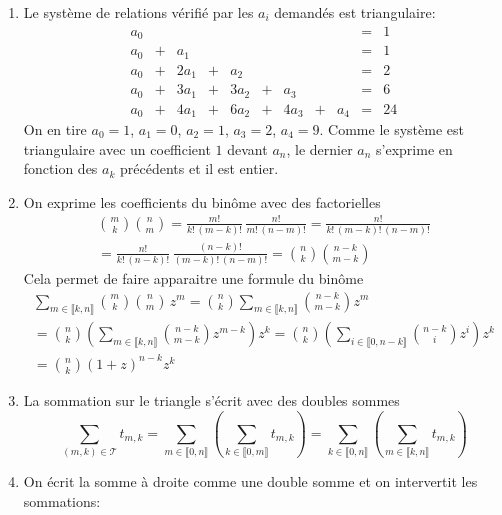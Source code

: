 \begin{enumerate}
  \item Le système de relations vérifié par les $a_i$ demandés est triangulaire:
\begin{align*}
  a_0  &       &      &       &      &       &      &       &     & = & 1\\
  a_0  & {}+{} & a_1  &       &      &       &      &       &     & = & 1\\
  a_0  & {}+{} & 2a_1 & {}+{} & a_2  &       &      &       &     & = & 2 \\
  a_0  & {}+{} & 3a_1 & {}+{} & 3a_2 & {}+{} & a_3  &       &     & = & 6\\
  a_0  & {}+{} & 4a_1 & {}+{} & 6a_2 & {}+{} & 4a_3 & {}+{} & a_4 & = & 24 
\end{align*}
On en tire $a_0=1$, $a_1=0$, $a_2=1$, $a_3=2$, $a_4=9$. Comme le système est triangulaire avec un coefficient $1$ devant $a_n$, le dernier $a_n$ s'exprime en fonction des $a_k$ précédents et il est entier.
\item On exprime les coefficients du binôme avec des factorielles
\begin{multline*}
\binom{m}{k} \binom{n}{m}
= \frac{m!}{k!\, (m-k)!} \, \frac{n!}{m!\,(n-m)!}
= \frac{n!}{k!\, (m-k)!\, (n-m)!}\\
=\frac{n!}{k!\, (n-k)!}\,\frac{(n-k)!}{(m-k)!\, (n-m)!}
= \binom{n}{k} \binom{n-k}{m-k}
\end{multline*}
Cela permet de faire apparaitre une formule du binôme
\begin{multline*}
\sum_{m \in \llbracket k,n \rrbracket} \binom{m}{k}\binom{n}{m}\,z^m
= \binom{n}{k}\sum_{m \in \llbracket k,n \rrbracket} \binom{n-k}{m-k}z^{m}\\
= \binom{n}{k}\left( \sum_{m \in \llbracket k,n \rrbracket} \binom{n-k}{m-k}z^{m-k}\right) z^k
= \binom{n}{k}\left( \sum_{i \in \llbracket 0,n-k \rrbracket} \binom{n-k}{i}z^{i}\right) z^k\\
= \binom{n}{k}(1+z)^{n-k} z^k 
\end{multline*}
\item La sommation sur le triangle s'écrit avec des doubles sommes
\begin{displaymath}
\sum_{(m,k)\in \mathcal{T}} t_{m,k} 
= \sum_{m\in \llbracket 0, n\rrbracket} \left(\sum_{k\in \llbracket 0, m\rrbracket} t_{m,k}\right)
= \sum_{k\in \llbracket 0, n\rrbracket} \left(\sum_{m\in \llbracket k, n\rrbracket} t_{m,k}\right)   
\end{displaymath}
\item On écrit la somme à droite comme une double somme et on intervertit les sommations:

\end{enumerate}

